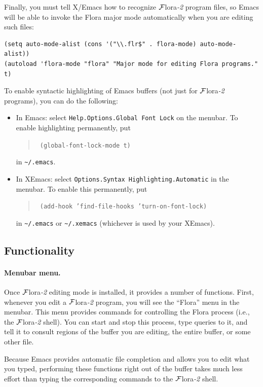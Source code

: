 \documentclass[11pt]{article}
\newcommand{\FLORA}{{\mbox{\sc ${\cal F}${lora}\rm\emph{-2}}}\xspace}
\begin{document}
Finally, you must tell X/Emacs how to recognize \FLORA program files, so
Emacs will be able to invoke the Flora major mode automatically when you
are editing such files:
\begin{verbatim}
(setq auto-mode-alist (cons '("\\.flr$" . flora-mode) auto-mode-alist))
(autoload 'flora-mode "flora" "Major mode for editing Flora programs." t)
\end{verbatim}

To enable syntactic highlighting of Emacs buffers (not just for \FLORA
programs), you can do the following:
\begin{itemize}
  \item  {\sf In Emacs:} select {\tt Help.Options.Global Font Lock} on
    the menubar.  To enable highlighting permanently, put 
    \begin{quote}
      \tt
      (global-font-lock-mode t)
    \end{quote}
    in \verb|~/.emacs|.
  \item {\sf In XEmacs:} select {\tt Options.Syntax
        Highlighting.Automatic} in the menubar. To enable this permanently, put
      \begin{quote}
        \tt
        (add-hook 'find-file-hooks 'turn-on-font-lock)
      \end{quote}
      in \verb|~/.emacs| or \verb|~/.xemacs| (whichever is used by your
      XEmacs).
\end{itemize}


\subsection{Functionality}


\paragraph{Menubar menu.}
Once \FLORA editing mode is installed, it provides a number of functions.
First, whenever you edit a \FLORA program, you will see the ``Flora'' menu
in the menubar. This menu provides commands for controlling the Flora
process (i.e., the \FLORA shell). You can start and stop
this process, type queries to it, and tell it to consult regions of
the buffer you are editing, the entire buffer, or some other file.

Because Emacs provides automatic file completion and allows you to edit
what you typed, performing these functions right out of the buffer takes
much less effort than typing the corresponding commands to the \FLORA
shell.
\end{document}
